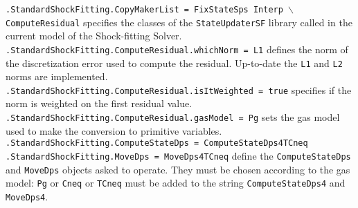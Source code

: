 \documentclass[11pt,a4paper,oneside]{article}
\begin{document}
\hspace*{1cm} \texttt{.StandardShockFitting.CopyMakerList = FixStateSps Interp $\backslash$}
\newline
 \hspace*{8.6cm} \texttt{ComputeResidual}
\newline
\newline
specifies the classes of the \texttt{StateUpdaterSF} library called in the current model of the Shock-fitting Solver.
\newline
\newline
\hspace*{1cm} \texttt{.StandardShockFitting.ComputeResidual.whichNorm = L1}
\newline
\newline
defines the norm of the discretization error used to compute the residual. Up-to-date the \texttt{L1} and \texttt{L2} norms are implemented.
\newline
\newline
\hspace*{1cm} \texttt{.StandardShockFitting.ComputeResidual.isItWeighted = true}
\newline
\newline
specifies if the norm is weighted on the first residual value.
\newline
\newline
\hspace*{1cm} \texttt{.StandardShockFitting.ComputeResidual.gasModel = Pg}
\newline
\newline
sets the gas model used to make the conversion to primitive variables.
\newline
\newline
\hspace*{1cm} \texttt{.StandardShockFitting.ComputeStateDps = ComputeStateDps4TCneq}
\newline
\hspace*{1cm} \texttt{.StandardShockFitting.MoveDps = MoveDps4TCneq}
\newline
\newline
define the \texttt{ComputeStateDps} and \texttt{MoveDps} objects asked to operate. They must be chosen according to the gas model: \texttt{Pg} or \texttt{Cneq} or \texttt{TCneq} must be added to the string \texttt{ComputeStateDps4} and \texttt{MoveDps4}.
\end{document}
